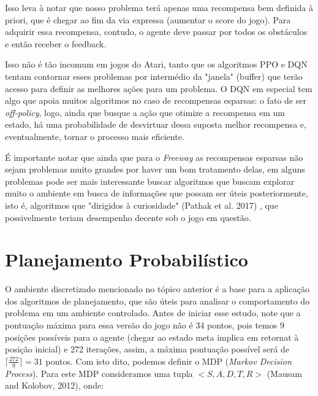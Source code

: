 \documentclass[letterpaper]{article} %
\begin{document}
Isso leva à notar que nosso problema terá apenas uma recompensa bem definida à priori, que é chegar ao fim da via expressa (aumentar o score do jogo). Para adquirir essa recompensa, contudo, o agente deve passar por todos os obstáculos e então receber o feedback.

Isso não é tão incomum em jogos do Atari, tanto que os algoritmos PPO e DQN tentam contornar esses problemas por intermédio da "janela" (buffer) que terão acesso para definir as melhores ações para um problema. O DQN em especial tem algo que apoia muitos algoritmos no caso de recompensas esparsas: o fato de ser \textit{off-policy}, logo, ainda que busque a ação que otimize a recompensa em um estado, há uma probabilidade de desvirtuar dessa suposta melhor recompensa e, eventualmente, tornar o processo mais eficiente.

É importante notar que ainda que para o \textit{Freeway} as recompensas esparsas não sejam problemas muito grandes por haver um bom tratamento delas, em alguns problemas pode ser mais interessante buscar algoritmos que buscam explorar muito o ambiente em busca de informações que possam ser úteis posteriormente, isto é, algoritmos que "dirigidos à curiosidade" (Pathak et al. 2017) , que possivelmente teriam desempenho decente sob o jogo em questão.


\section{Planejamento Probabilístico}
O ambiente discretizado mencionado no tópico anterior é a base para a aplicação dos algoritmos de planejamento, que são úteis para analisar o comportamento do problema em um ambiente controlado. Antes de iniciar esse estudo, note que a pontuação máxima para essa versão do jogo não é 34 pontos, pois temos 9 posições possíveis para o agente (chegar ao estado meta implica em retornat à posição inicial) e 272 iterações, assim, a máxima pontuação possível será de $\lceil \frac{272}{9}\rceil = 31$ pontos. Com isto dito, podemos definir o MDP (\textit{Markov Decision Process}). Para este MDP consideramos uma tupla $<S,A,D,T,R>$ (Mausam and Kolobov, 2012), onde: 
\end{document}
